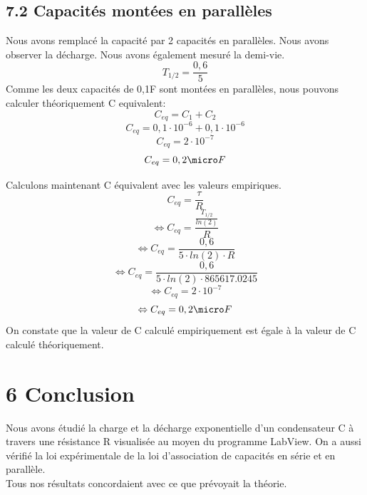 \documentclass{report}
\begin{document}
\subsection*{7.2 Capacit\'es mont\'ees en parall\`eles}
\hspace*{0.5cm}
Nous avons remplac\'e la capacit\'e par 2 capacit\'es en parall\`eles. Nous avons observer la d\'echarge. Nous avons \'egalement mesur\'e la demi-vie.
\begin{equation}
   T_{1/2} = \frac{0,6}{5}
\end{equation}
Comme les deux capacit\'es de 0,1\micro F sont mont\'ees en parall\`eles, nous pouvons calculer th\'eoriquement C equivalent:
\begin{equation}
    C_{eq} = C_1 + C_2
\end{equation}
\begin{equation}
    C_{eq} = 0,1 \cdot 10^{-6} +  0,1 \cdot 10^{-6}
\end{equation}
\begin{equation}
    C_{eq} = 2 \cdot 10^{-7}
\end{equation}
\begin{equation}
    C_{eq} = 0,2 \micro F
\end{equation}

Calculons maintenant C \'equivalent avec les valeurs empiriques.
\begin{equation}
    C_{eq} = \frac{\tau}{R}
\end{equation}
\begin{equation}
    \Leftrightarrow C_{eq} = \frac{\frac{T_{1/2}}{ln(2)}}{R}
\end{equation}
\begin{equation}
    \Leftrightarrow C_{eq} = \frac{0,6}{5 \cdot ln(2) \cdot R}
\end{equation}
\begin{equation}
    \Leftrightarrow C_{eq} = \frac{0,6}{5 \cdot ln(2) \cdot 865617.0245}
\end{equation}
\begin{equation}
    \Leftrightarrow C_{eq} = 2 \cdot 10^{-7}
\end{equation}
\begin{equation}
    \Leftrightarrow C_{eq} = 0,2 \micro F
\end{equation}
On constate que la valeur de C calcul\'e empiriquement est \'egale \`a la valeur de C calcul\'e th\'eoriquement.

\section*{6 Conclusion}
\hspace*{0.5cm}
Nous avons \'etudi\'e la charge et la d\'echarge exponentielle d'un condensateur C \`a travers une r\'esistance R visualis\'ee au moyen du programme LabView. On a aussi v\'erifi\'e la loi exp\'erimentale de la loi d'association de capacit\'es en s\'erie et en parall\`ele.\\

Tous nos r\'esultats concordaient avec ce que pr\'evoyait la th\'eorie.
\end{document}
